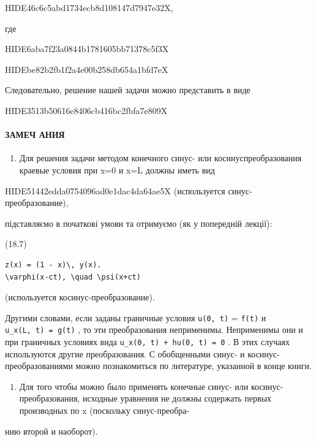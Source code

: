 \documentclass[
  ukrainian,
]{article}
\providecommand{\tightlist}{%
  \setlength{\itemsep}{0pt}\setlength{\parskip}{0pt}}
\begin{document}
HIDE46c6c5abd1734ecb8d108147d7947e32X,

где

HIDE6aba7f23a0844b1781605bb71378c5f3X

HIDEbe82b2fb1f2a4e00b258db654a1bfd7eX

Следовательно, решение нашей задачи можно представить в виде

HIDE3513b50616e8406cb416bc2fbfa7e809X

\paragraph{ЗАМЕЧ
АНИЯ}\label{ux437ux430ux43cux435ux447-ux430ux43dux438ux44f}

\begin{enumerate}
\def\labelenumi{\arabic{enumi}.}
\tightlist
\item
  Для решения задачи методом конечного синус- или косинуспреобразования
  краевые условия при x=0 и x=L должны иметь вид
\end{enumerate}

HIDE51442edda0754096ad0e1dac4da64ae5X (используется
синус-преобразование),

підставляємо в початкові умови та отримуємо (як у попередній лекції):

(18.7)

\begin{verbatim}
z(x) = (1 - x)\, y(x).
\varphi(x-ct), \quad \psi(x+ct)
\end{verbatim}

(используется косинус-преобразование).

Другими словами, если заданы граничные условия \texttt{u(0,\ t)} =
\texttt{f(t)} и \texttt{u\_x(L,\ t)\ =\ g(t)} , то эти преобразования
неприменимы. Неприменимы они и при граничных условиях вида
\texttt{u\_x(0,\ t)\ +\ hu(0,\ t)\ =\ 0} . В этих случаях используются
другие преобразования. С обобщенными синус- и косинус-преобразованиями
можно познакомиться по литературе, указанной в конце книги.

\begin{enumerate}
\def\labelenumi{\arabic{enumi}.}
\setcounter{enumi}{1}
\tightlist
\item
  Для того чтобы можно было применять конечные синус- или
  косинус-преобразования, исходные уравнения не должны содержать первых
  производных по x (поскольку синус-преобра-
\end{enumerate}

нию второй и наоборот).
\end{document}
